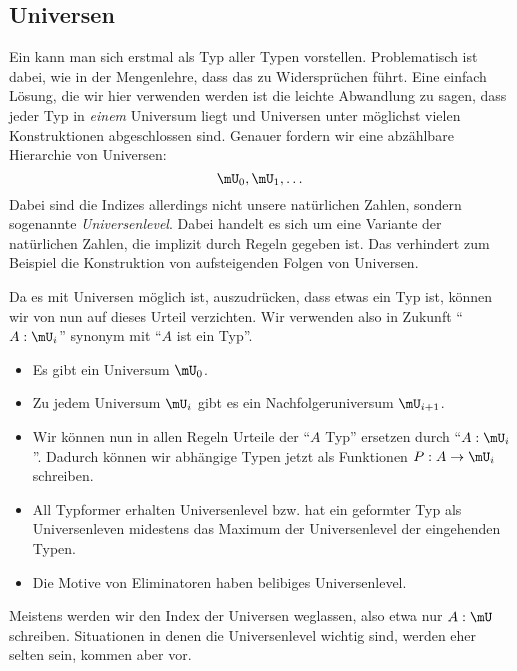\subsection{Universen}
Ein  kann man sich erstmal als Typ aller Typen vorstellen.
Problematisch ist dabei, wie in der Mengenlehre, dass das zu Widersprüchen führt.
Eine einfach Lösung, die wir hier verwenden werden ist die leichte Abwandlung zu sagen, dass jeder Typ in \emph{einem} Universum liegt und Universen unter möglichst vielen Konstruktionen abgeschlossen sind.
Genauer fordern wir eine abzählbare Hierarchie von Universen:
\[
  \mU_0, \mU_1, \dots
\]
Dabei sind die Indizes allerdings nicht unsere natürlichen Zahlen, sondern sogenannte \emph{Universenlevel}.
Dabei handelt es sich um eine Variante der natürlichen Zahlen, die implizit durch Regeln gegeben ist.
Das verhindert zum Beispiel die Konstruktion von aufsteigenden Folgen von Universen.

Da es mit Universen möglich ist, auszudrücken, dass etwas ein Typ ist, können wir von nun auf dieses Urteil verzichten.
Wir verwenden also in Zukunft ``$A:\mU_i$'' synonym mit ``$A$ ist ein Typ''.

\begin{regeln}
\begin{itemize}
\item Es gibt ein Universum $\mU_0$.
\item Zu jedem Universum $\mU_i$ gibt es ein Nachfolgeruniversum $\mU_{i+1}$.
\item Wir können nun in allen Regeln Urteile der ``$A$ Typ'' ersetzen durch ``$A:\mU_i$''.
  Dadurch können wir abhängige Typen jetzt als Funktionen $P:A\to\mU_i$ schreiben.
\item All Typformer erhalten Universenlevel bzw. hat ein geformter Typ als Universenleven midestens das Maximum der Universenlevel der eingehenden Typen.
\item Die Motive von Eliminatoren haben belibiges Universenlevel.
\end{itemize}
\end{regeln}

\begin{konvention}
  Meistens werden wir den Index der Universen weglassen, also etwa nur $A:\mU$ schreiben.
  Situationen in denen die Universenlevel wichtig sind, werden eher selten sein, kommen aber vor.
\end{konvention}

